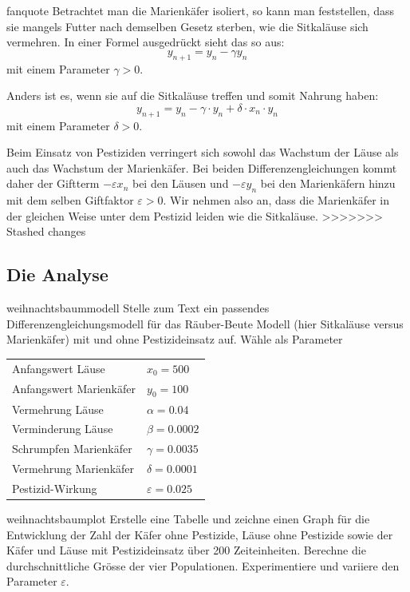 \documentclass[%
<<<<<<< Updated upstream
<<<<<<< Updated upstream
11pt,%
twoside,%
titlepage,%
german,%
headsepline%
]{scrartcl}
\newcommand{\spaltenheight}{\rule{0mm}{3ex}}
\newcommand{\spaltensep}{\\[1ex]}
\begin{document}
\begin{uebenv}{fanquote}
Betrachtet man die Marienkäfer isoliert, so kann man feststellen, dass sie mangels Futter nach demselben Gesetz sterben, wie die Sitkaläuse sich vermehren. In einer Formel ausgedrückt sieht das so aus:
$$y_{n+1}=y_n-\gamma y_n$$
mit einem Parameter $\gamma > 0$.

Anders ist es, wenn sie auf die Sitkaläuse treffen und somit Nahrung haben:
$$y_{n+1}=y_n-\gamma\cdot y_n+\delta\cdot x_n\cdot y_n$$
mit einem Parameter $\delta> 0$.

Beim Einsatz von Pestiziden verringert sich sowohl das Wachstum der Läuse als auch das Wachstum der Marienkäfer. Bei beiden Differenzengleichungen kommt daher der Giftterm $-\varepsilon x_n$ bei den Läusen und $-\varepsilon y_n$ bei den Marienkäfern hinzu mit dem selben Giftfaktor $\varepsilon > 0$. Wir nehmen also an, dass die Marienkäfer in der gleichen Weise unter dem Pestizid leiden wie die Sitkaläuse.
>>>>>>> Stashed changes

\subsection{Die Analyse}
\begin{uebenv}{weihnachtsbaummodell}
    Stelle zum Text ein passendes Differenzengleichungsmodell für das Räuber-Beute Modell (hier Sitkaläuse versus Marienkäfer) mit und ohne Pestizideinsatz auf. Wähle als Parameter

\begin{center}
\begin{tabular}{ll}
\spaltenheight Anfangswert Läuse & $x_0=500$\spaltensep
\spaltenheight Anfangswert Marienkäfer\hspace*{3ex} & $y_0=100$\spaltensep
\spaltenheight Vermehrung Läuse & $\alpha=0.04$\spaltensep
\spaltenheight Verminderung Läuse & $\beta=0.0002$\spaltensep
\spaltenheight Schrumpfen Marienkäfer & $\gamma=0.0035$\spaltensep
\spaltenheight Vermehrung Marienkäfer & $\delta=0.0001$\spaltensep
\spaltenheight Pestizid-Wirkung & $\varepsilon=0.025$
\end{tabular}
\end{center}
\end{uebenv}

\begin{uebenv}{weihnachtsbaumplot}
    Erstelle eine Tabelle und zeichne einen Graph für die Entwicklung der Zahl der Käfer ohne Pestizide, Läuse ohne Pestizide sowie der Käfer und Läuse mit Pestizideinsatz über 200 Zeiteinheiten. Berechne die durchschnittliche Grösse der vier Populationen. Experimentiere und variiere den Parameter $\varepsilon$.
\end{uebenv}


\end{uebenv}
\end{document}
